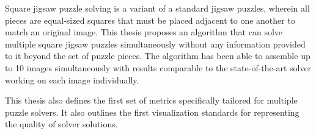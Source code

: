 Square jigsaw puzzle solving is a variant of a standard jigsaw puzzles, wherein all pieces are equal-sized squares that must be placed adjacent to one another to match an original image.  This thesis proposes an algorithm that can solve multiple square jigsaw puzzles simultaneously without any information provided to it beyond the set of puzzle pieces.  The algorithm has been able to assemble up to 10 images simultaneously with results comparable to the state-of-the-art solver working on each image individually.

This thesis also defines the first set of metrics specifically tailored for multiple puzzle solvers.  It also outlines the first visualization standards for representing the quality of solver solutions.
